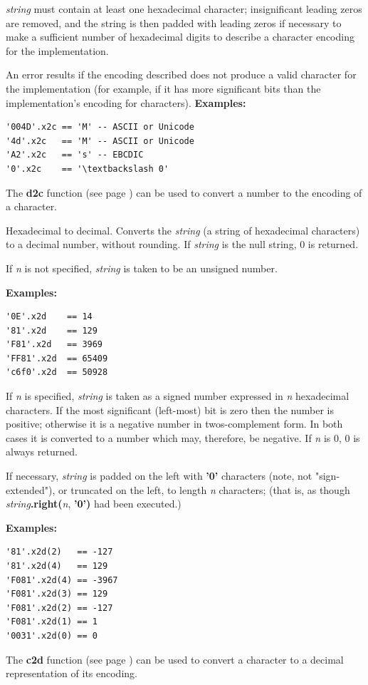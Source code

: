 \begin{description}
\emph{string} must contain at least one hexadecimal character;
insignificant leading zeros are removed, and the string is then padded
with leading zeros if necessary to make a sufficient number of
hexadecimal digits to describe a character encoding for the
implementation.
 
An error results if the encoding described does not produce a valid
character for the implementation (for example, if it has more
significant bits than the implementation's encoding for characters).
 \textbf{Examples:}
\begin{lstlisting}
'004D'.x2c == 'M' -- ASCII or Unicode
'4d'.x2c   == 'M' -- ASCII or Unicode
'A2'.x2c   == 's' -- EBCDIC
'0'.x2c    == '\textbackslash 0'
\end{lstlisting}
 The  \textbf{d2c} function (see page \pageref{refd2c})  can be used to
convert a \crexx{} number to the encoding of a character.

\item[x2d([n{]})]\label{refx2d}
Hexadecimal to decimal.
Converts the \emph{string} (a string of hexadecimal characters) to
a decimal number, without rounding.
If \emph{string} is the null string, 0 is returned.
 
If \emph{n} is not specified, \emph{string} is taken to
be an unsigned number.
 
\textbf{Examples:}
\begin{lstlisting}
'0E'.x2d    == 14
'81'.x2d    == 129
'F81'.x2d   == 3969
'FF81'.x2d  == 65409
'c6f0'.x2d  == 50928
\end{lstlisting}
 
If \emph{n} is specified, \emph{string} is taken as a signed
number expressed in \emph{n} hexadecimal characters.
If the most significant (left-most) bit is zero then the number is
positive; otherwise it is a negative number in twos-complement form.
In both cases it is converted to a \crexx{} number which may,
therefore, be negative.
If \emph{n} is 0, 0 is always returned.
 
If necessary, \emph{string} is padded on the left
with \textbf{'0'} characters (note, not "sign-extended"), or
truncated on the left, to length \emph{n} characters; (that is, as
though \emph{string}\textbf{.right(}\emph{n}, \textbf{'0')}
had been executed.)
 
\textbf{Examples:}
\begin{lstlisting}
'81'.x2d(2)   == -127
'81'.x2d(4)   == 129
'F081'.x2d(4) == -3967
'F081'.x2d(3) == 129
'F081'.x2d(2) == -127
'F081'.x2d(1) == 1
'0031'.x2d(0) == 0
\end{lstlisting}
 The  \textbf{c2d} function (see page \pageref{refc2d})  can be used to convert
a character to a decimal representation of its encoding.
\end{description}
